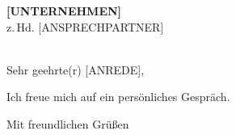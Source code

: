 \documentclass[version=last]{scrlttr2}
\begin{document}
\begin{letter}{%
    \textbf{[UNTERNEHMEN]}\\
    z.\,Hd. [ANSPRECHPARTNER]\\
    [STRASSE]\\
    [PLZ ORT]
}

\opening{Sehr geehrte(r) [ANREDE],}







Ich freue mich auf ein persönliches Gespräch.

\closing{Mit freundlichen Grüßen}

\end{letter}
\end{document}
